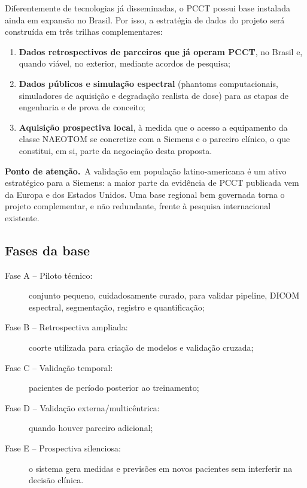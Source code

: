 \documentclass[11pt,a4paper]{article}
\newcommand{\atencao}{\textcolor{titleblue}{\textbf{Ponto de atenção.}}\ }
\begin{document}
Diferentemente de tecnologias já disseminadas, o PCCT possui base instalada ainda em expansão no Brasil. Por isso, a estratégia de dados do projeto será construída em três trilhas complementares:

\begin{enumerate}
\item \textbf{Dados retrospectivos de parceiros que já operam PCCT}, no Brasil e, quando viável, no exterior, mediante acordos de pesquisa;
\item \textbf{Dados públicos e simulação espectral} (phantoms computacionais, simuladores de aquisição e degradação realista de dose) para as etapas de engenharia e de prova de conceito;
\item \textbf{Aquisição prospectiva local}, à medida que o acesso a equipamento da classe NAEOTOM se concretize com a Siemens e o parceiro clínico, o que constitui, em si, parte da negociação desta proposta.
\end{enumerate}

\begin{caixa}
\atencao A validação em população latino-americana é um ativo estratégico para a Siemens: a maior parte da evidência de PCCT publicada vem da Europa e dos Estados Unidos. Uma base regional bem governada torna o projeto complementar, e não redundante, frente à pesquisa internacional existente.
\end{caixa}

\subsection{Fases da base}

\begin{description}
\item[Fase A -- Piloto técnico:] conjunto pequeno, cuidadosamente curado, para validar pipeline, DICOM espectral, segmentação, registro e quantificação;
\item[Fase B -- Retrospectiva ampliada:] coorte utilizada para criação de modelos e validação cruzada;
\item[Fase C -- Validação temporal:] pacientes de período posterior ao treinamento;
\item[Fase D -- Validação externa/multicêntrica:] quando houver parceiro adicional;
\item[Fase E -- Prospectiva silenciosa:] o sistema gera medidas e previsões em novos pacientes sem interferir na decisão clínica.
\end{description}
\end{document}
